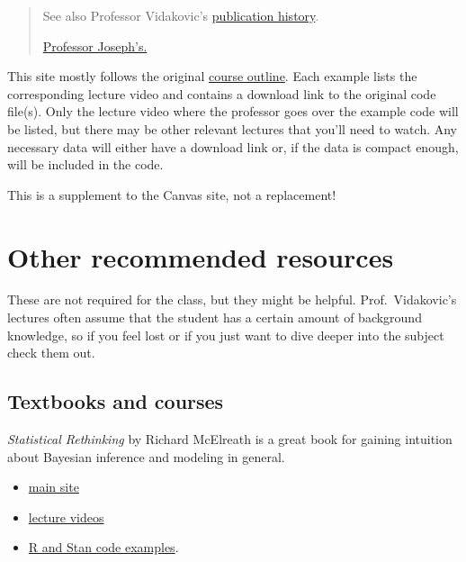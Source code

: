 \documentclass[
  letterpaper,
  DIV=11,
  numbers=noendperiod]{scrreprt}
\providecommand{\tightlist}{%
  \setlength{\itemsep}{0pt}\setlength{\parskip}{0pt}}\usepackage{longtable,booktabs,array}
\begin{document}
\begin{quote}
See also Professor Vidakovic's
\href{https://scholar.google.com/citations?user=mjLdzMAAAAAJ}{publication
history}.

\href{https://scholar.google.com/citations?hl=en\&user=-XDlRfAAAAAJ}{Professor
Joseph's.}
\end{quote}

This site mostly follows the original
\href{https://www2.isye.gatech.edu/isye6420/plan.html}{course outline}.
Each example lists the corresponding lecture video and contains a
download link to the original code file(s). Only the lecture video where
the professor goes over the example code will be listed, but there may
be other relevant lectures that you'll need to watch. Any necessary data
will either have a download link or, if the data is compact enough, will
be included in the code.

This is a supplement to the Canvas site, not a replacement!

\hypertarget{other-recommended-resources}{%
\section*{Other recommended
resources}\label{other-recommended-resources}}


These are not required for the class, but they might be helpful.
Prof.~Vidakovic's lectures often assume that the student has a certain
amount of background knowledge, so if you feel lost or if you just want
to dive deeper into the subject check them out.

\hypertarget{textbooks-and-courses}{%
\subsection*{Textbooks and courses}\label{textbooks-and-courses}}

\emph{Statistical Rethinking} by Richard McElreath is a great book for
gaining intuition about Bayesian inference and modeling in general.

\begin{itemize}
\tightlist
\item
  \href{https://xcelab.net/rm/statistical-rethinking/}{main site}
\item
  \href{https://www.youtube.com/playlist?list=PLDcUM9US4XdMROZ57-OIRtIK0aOynbgZN}{lecture
  videos}
\item
  \href{https://github.com/rmcelreath/rethinking}{R and Stan code
  examples}.
\end{itemize}
\end{document}
